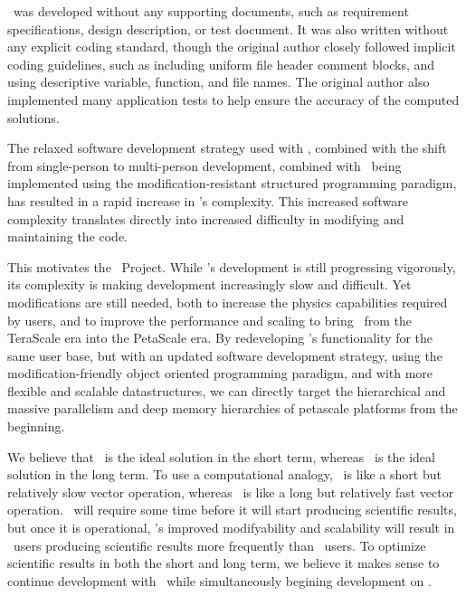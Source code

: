\documentclass{article}
\begin{document}
    \enzo\ was developed without any supporting documents, such as
    requirement specifications, design description, or test document.
    It was also written without any explicit coding standard, though
    the original author closely followed implicit coding guidelines,
    such as including uniform file header comment blocks, and using
    descriptive variable, function, and file names.  The original
    author also implemented many application tests to help ensure the
    accuracy of the computed solutions.  

    The relaxed software development strategy used with \enzo,
    combined with the shift from single-person to multi-person
    development, combined with \enzo\ being implemented using the
    modification-resistant structured programming paradigm, has
    resulted in a rapid increase in \enzo's complexity.  This
    increased software complexity translates directly into increased
    difficulty in modifying and maintaining the code.

    This motivates the \cello\ Project.  While \enzo's development is
    still progressing vigorously, its complexity is making development
    increasingly slow and difficult.  Yet modifications are still
    needed, both to increase the physics capabilities required by
    users, and to improve the performance and scaling to bring \enzo\
    from the TeraScale era into the PetaScale era.  By redeveloping
    \enzo's functionality for the same user base, but with an updated
    software development strategy, using the modification-friendly
    object oriented programming paradigm, and with more flexible and
    scalable datastructures, we can directly target the hierarchical
    and massive parallelism and deep memory hierarchies of petascale
    platforms from the beginning.

    We believe that \enzo\ is the ideal solution in the short term,
    whereas \cello\ is the ideal solution in the long term.  To use a
    computational analogy, \enzo\ is like a short but relatively slow
    vector operation, whereas \cello\ is like a long but relatively
    fast vector operation.  \cello\ will require some time before it
    will start producing scientific results, but once it is
    operational, \cello's improved modifyability and scalability will
    result in \cello\ users producing scientific results more
    frequently than \enzo\ users.  To optimize scientific results in
    both the short and long term, we believe it makes sense to
    continue development with \enzo\ while simultaneously begining
    development on \cello.
  
\end{document}
